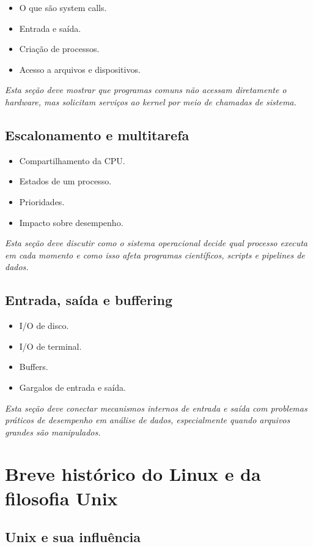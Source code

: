 \documentclass[12pt,openany]{book}
\newcommand{\placeholder}[1]{
    \par\medskip
    \noindent\textit{#1}
    \par\medskip
}
\newcommand{\topicos}[1]{
    \begin{itemize}
        #1
    \end{itemize}
}
\begin{document}
\begin{refsection}
\topicos{
    \item O que são system calls.
    \item Entrada e saída.
    \item Criação de processos.
    \item Acesso a arquivos e dispositivos.
}

\placeholder{Esta seção deve mostrar que programas comuns não acessam diretamente o hardware, mas solicitam serviços ao kernel por meio de chamadas de sistema.}

\section{Escalonamento e multitarefa}

\topicos{
    \item Compartilhamento da CPU.
    \item Estados de um processo.
    \item Prioridades.
    \item Impacto sobre desempenho.
}

\placeholder{Esta seção deve discutir como o sistema operacional decide qual processo executa em cada momento e como isso afeta programas científicos, scripts e pipelines de dados.}

\section{Entrada, saída e buffering}

\topicos{
    \item I/O de disco.
    \item I/O de terminal.
    \item Buffers.
    \item Gargalos de entrada e saída.
}

\placeholder{Esta seção deve conectar mecanismos internos de entrada e saída com problemas práticos de desempenho em análise de dados, especialmente quando arquivos grandes são manipulados.}

\chapter{Breve histórico do Linux e da filosofia Unix}

\section{Unix e sua influência}


\end{refsection}
\end{document}
